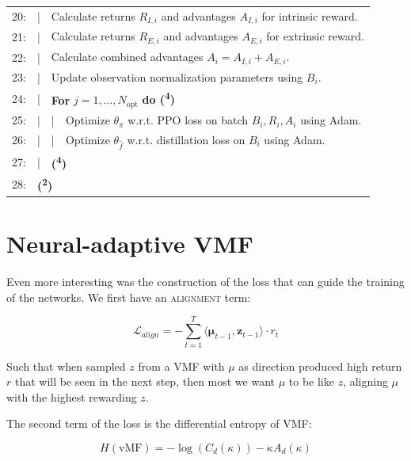 \begin{table}[H]
\begin{tabular}{rlll}
    20: & | & \multicolumn{2}{l}{Calculate returns $R_{I,i}$ and advantages $A_{I,i}$ for intrinsic reward.}\\
    21: & | & \multicolumn{2}{l}{Calculate returns $R_{E,i}$ and advantages $A_{E,i}$ for extrinsic reward.}\\
    22: & | & \multicolumn{2}{l}{Calculate combined advantages $A_{i} = A_{I,i} + A_{E,i}$.}\\
    23: & | & \multicolumn{2}{l}{Update observation normalization parameters using $B_{i}$.}\\
    24: & | & \multicolumn{2}{l}{\textbf{For} $j = 1, ..., N_{\text{opt}}$ \textbf{do (\textsuperscript{4})}}\\
    25: & | & | & Optimize $\theta_{\pi}$ w.r.t. \textsc{PPO} loss on batch $B_{i}, R_{i}, A_{i}$ using Adam.\\
    26: & | & | & Optimize $\theta_{\hat{f}}$ w.r.t. distillation loss on $B_{i}$ using Adam.\\
    27: & | & \multicolumn{2}{l}{\textbf{(\textsuperscript{4})}}\\
    28: & \multicolumn{3}{l}{\textbf{(\textsuperscript{2})}}\\
    \hline\hline
  \end{tabular}
\end{table}

\clearpage
\hypertarget{na-vmf}{\section{Neural-adaptive VMF}}

Even more interesting was the construction of the loss that can guide the training of the networks. We first have an \textsc{alignment} term:

\begin{equation}
    \mathcal{L}_{align} = - \sum_{t=1}^{T} \langle \boldsymbol{\mu}_{t-1}, \textbf{z}_{t-1} \rangle \cdot r_{t}
\end{equation}

Such that when sampled $z$ from a VMF with $\mu$ as direction produced high return $r$ that will be seen in the next step, then most we want $\mu$ to be like $z$, aligning $\mu$ with the highest rewarding $z$.

The second term of the loss is the differential entropy of VMF:

\begin{equation}
    H(\text{vMF}) = -\log(C_d(\kappa)) - \kappa A_d(\kappa)
\end{equation}

